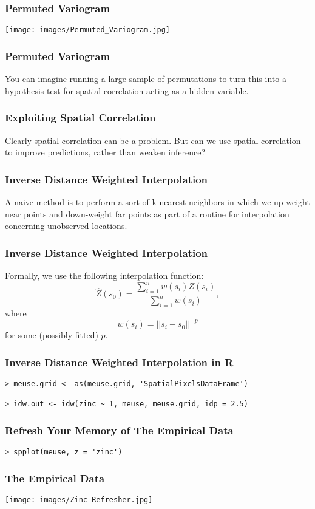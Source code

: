 \documentclass{beamer}
\begin{document}
\frame
{
	\frametitle{Permuted Variogram}

	\begin{center}
		\texttt{[image: images/Permuted\_Variogram.jpg]}
	\end{center}
}


\frame
{
	\frametitle{Permuted Variogram}
	
	You can imagine running a large sample of permutations to turn this into a hypothesis test for spatial correlation acting as a hidden variable.
}

\frame
{
	\frametitle{Exploiting Spatial Correlation}
	
	Clearly spatial correlation can be a problem. But can we use spatial correlation to improve predictions, rather than weaken inference?
}

\frame
{
	\frametitle{Inverse Distance Weighted Interpolation}
	
	A naive method is to perform a sort of k-nearest neighbors in which we up-weight near points and down-weight far points as part of a routine for interpolation concerning unobserved locations.
}

\frame
{
	\frametitle{Inverse Distance Weighted Interpolation}
	
	Formally, we use the following interpolation function:
	\[
	\hat{Z}(s_0) = \frac{\sum_{i = 1}^{n} w(s_i) Z(s_i)}{\sum_{i = 1}^{n} w(s_i)},
	\]
	where
	\[
		w(s_i) = ||s_i - s_0||^{-p}
	\]
	for some (possibly fitted) $p$.
}

\begin{frame}[fragile]
	\frametitle{Inverse Distance Weighted Interpolation in R}
	
	\begin{verbatim}
> meuse.grid <- as(meuse.grid, 'SpatialPixelsDataFrame')

> idw.out <- idw(zinc ~ 1, meuse, meuse.grid, idp = 2.5)
	\end{verbatim}
\end{frame}

\begin{frame}[fragile]
	\frametitle{Refresh Your Memory of The Empirical Data}

	\begin{verbatim}
> spplot(meuse, z = 'zinc')
	\end{verbatim}
\end{frame}

\frame
{
	\frametitle{The Empirical Data}
	
	\begin{center}
		\texttt{[image: images/Zinc\_Refresher.jpg]}
	\end{center}
}
\end{document}
